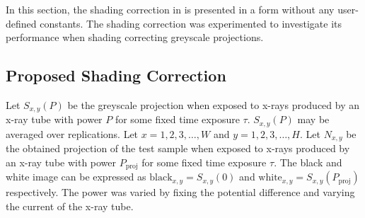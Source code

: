 In this section, the shading correction in \cite{seibert1998flat} is presented in a form without any user-defined constants. The shading correction was experimented to investigate its performance when shading correcting greyscale projections.

\subsection{Proposed Shading Correction}

Let $S_{x,y}(P)$ be the greyscale projection when exposed to x-rays produced by an x-ray tube with power $P$ for some fixed time exposure $\tau$. $S_{x,y}(P)$ may be averaged over replications. Let $x=1,2,3,\dotsc, W$ and $y=1,2,3,\dotsc,H$. Let $N_{x,y}$ be the obtained projection of the test sample when exposed to x-rays produced by an x-ray tube with power $P_\text{proj}$ for some fixed time exposure $\tau$. The black and white image can be expressed as $\text{black}_{x,y}=S_{x,y}(0)$ and $\text{white}_{x,y}=S_{x,y}(P_\text{proj})$ respectively. The power was varied by fixing the potential difference and varying the current of the x-ray tube.

